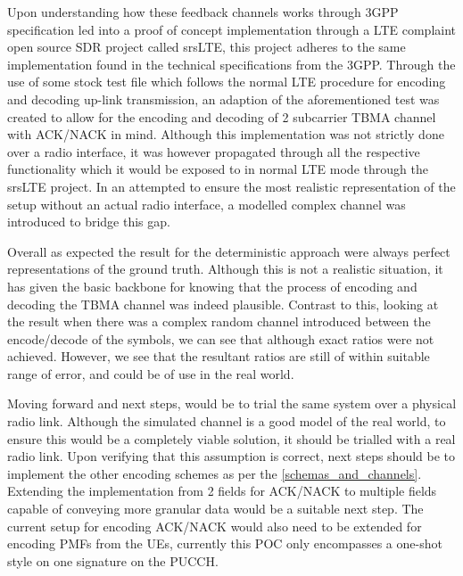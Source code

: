 \documentclass{article}
\begin{document}
Upon understanding how these feedback channels works through 3GPP specification led into a proof of concept implementation through a LTE complaint open source SDR project called srsLTE, this project adheres to the same implementation found in the technical specifications from the 3GPP. Through the use of some stock test file which follows the normal LTE procedure for encoding and decoding up-link transmission, an adaption of the aforementioned test was created to allow for the encoding and decoding of 2 subcarrier TBMA channel with ACK/NACK in mind. Although this implementation was not strictly done over a radio interface, it was however propagated through all the respective functionality which it would be exposed to in normal LTE mode through the srsLTE project. In an attempted to ensure the most realistic representation of the setup without an actual radio interface, a modelled complex channel was introduced to bridge this gap. 

Overall as expected the result for the deterministic approach were always perfect representations of the ground truth. Although this is not a realistic situation, it has given the basic backbone for knowing that the process of encoding and decoding the TBMA channel was indeed plausible. Contrast to this, looking at the result when there was a complex random channel introduced between the encode/decode of the symbols, we can see that although exact ratios were not achieved. However, we see that the resultant ratios are still of within suitable range of error, and could be of use in the real world. 

Moving forward and next steps, would be to trial the same system over a physical radio link. Although the simulated channel is a good model of the real world, to ensure this would be a completely viable solution, it should be trialled with a real radio link. Upon verifying that this assumption is correct, next steps should be to implement the other encoding schemes as per the \cref{schemas_and_channels}. Extending the implementation from 2 fields for ACK/NACK to multiple fields capable of conveying more granular data would be a suitable next step. The current setup for encoding ACK/NACK would also need to be extended for encoding PMFs from the UEs, currently this POC only encompasses a one-shot style on one signature on the PUCCH. 
\end{document}
